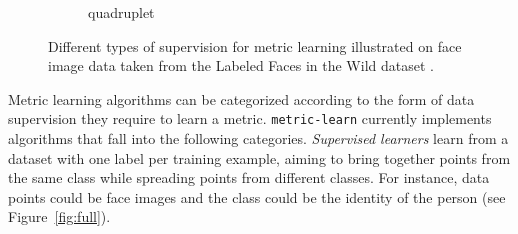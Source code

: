 \documentclass[twoside,11pt]{article}
\begin{document}
\begin{figure}[t]
\begin{subfigure}[t]{0.31\textwidth}
        \caption{quadruplet}\label{fig:quadruplets}
    \end{subfigure}
    \caption{Different types of supervision for metric learning %
    illustrated on face image data taken from the Labeled Faces in the Wild dataset \citep{Huang12}.}\label{fig:flowers}
\end{figure}

Metric learning algorithms can be categorized according to the form of data supervision they require to learn a metric.
\texttt{metric-learn} currently implements algorithms that fall into the following categories.
\emph{Supervised learners} learn from a dataset with one label per training example, aiming to bring together points from the same class while spreading points from different classes.
For instance, data points could be face images and the class could be the identity of the person (see Figure~\ref{fig:full}). 
\end{document}
